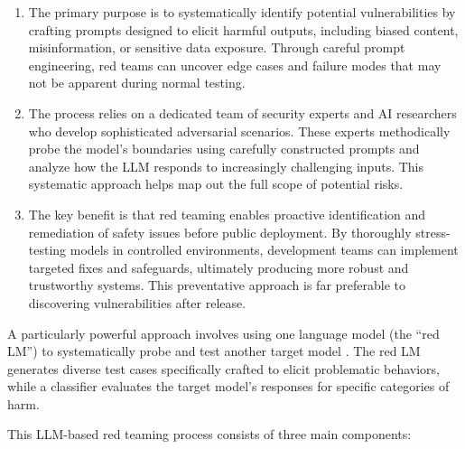 \begin{enumerate}
    \item The primary purpose is to systematically identify potential vulnerabilities by crafting prompts designed to elicit harmful outputs, including biased content, misinformation, or sensitive data exposure. Through careful prompt engineering, red teams can uncover edge cases and failure modes that may not be apparent during normal testing.
    \item The process relies on a dedicated team of security experts and AI researchers who develop sophisticated adversarial scenarios. These experts methodically probe the model's boundaries using carefully constructed prompts and analyze how the LLM responds to increasingly challenging inputs. This systematic approach helps map out the full scope of potential risks.
    \item The key benefit is that red teaming enables proactive identification and remediation of safety issues before public deployment. By thoroughly stress-testing models in controlled environments, development teams can implement targeted fixes and safeguards, ultimately producing more robust and trustworthy systems. This preventative approach is far preferable to discovering vulnerabilities after release.
\end{enumerate}

A particularly powerful approach involves using one language model (the ``red LM'') to systematically probe and test another target model . The red LM generates diverse test cases specifically crafted to elicit problematic behaviors, while a classifier evaluates the target model's responses for specific categories of harm.

This LLM-based red teaming process consists of three main components:

